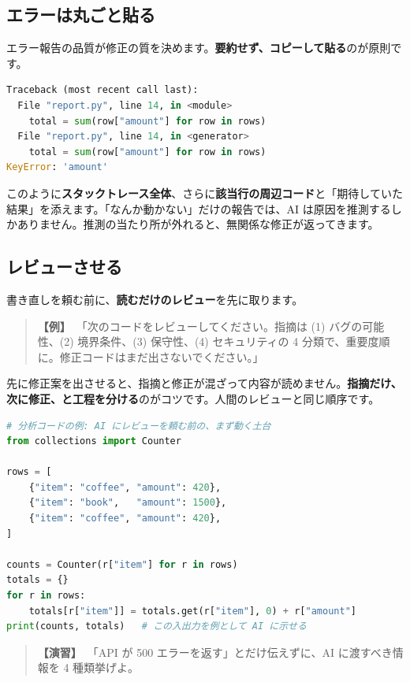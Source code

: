 \documentclass{article}
\begin{document}
\subsection{エラーは丸ごと貼る}

エラー報告の品質が修正の質を決めます。\textbf{要約せず、コピーして貼る}のが原則です。

\begin{lstlisting}[language=Python]
Traceback (most recent call last):
  File "report.py", line 14, in <module>
    total = sum(row["amount"] for row in rows)
  File "report.py", line 14, in <generator>
    total = sum(row["amount"] for row in rows)
KeyError: 'amount'
\end{lstlisting}

このように\textbf{スタックトレース全体}、さらに\textbf{該当行の周辺コード}と「期待していた結果」を添えます。「なんか動かない」だけの報告では、AI は原因を推測するしかありません。推測の当たり所が外れると、無関係な修正が返ってきます。

\subsection{レビューさせる}

書き直しを頼む前に、\textbf{読むだけのレビュー}を先に取ります。

\begin{quote}
\textbf{【例】}\ 「次のコードをレビューしてください。指摘は (1) バグの可能性、(2) 境界条件、(3) 保守性、(4) セキュリティの 4 分類で、重要度順に。修正コードはまだ出さないでください。」
\end{quote}

先に修正案を出させると、指摘と修正が混ざって内容が読めません。\textbf{指摘だけ、次に修正、と工程を分ける}のがコツです。人間のレビューと同じ順序です。

\begin{lstlisting}[language=Python]
# 分析コードの例: AI にレビューを頼む前の、まず動く土台
from collections import Counter

rows = [
    {"item": "coffee", "amount": 420},
    {"item": "book",   "amount": 1500},
    {"item": "coffee", "amount": 420},
]

counts = Counter(r["item"] for r in rows)
totals = {}
for r in rows:
    totals[r["item"]] = totals.get(r["item"], 0) + r["amount"]
print(counts, totals)   # この入出力を例として AI に示せる
\end{lstlisting}

\begin{quote}
\textbf{【演習】}\ 「API が 500 エラーを返す」とだけ伝えずに、AI に渡すべき情報を 4 種類挙げよ。
\end{quote}
\end{document}
